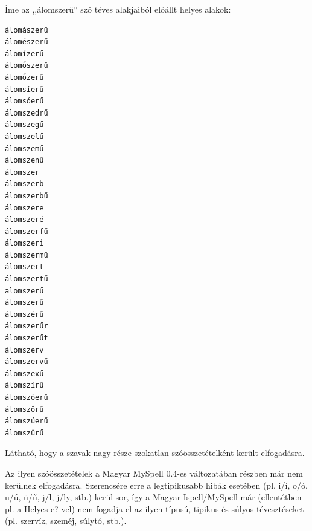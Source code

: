 Íme az ,,álomszerű'' szó téves alakjaiból előállt helyes
alakok:

\begin{verbatim}
álomászerű
álomészerű
álomízerű
álomőszerű
álomőzerű
álomsíerű
álomsóerű
álomszedrű
álomszegű
álomszelű
álomszemű
álomszenű
álomszer
álomszerb
álomszerbű
álomszere
álomszeré
álomszerfű
álomszeri
álomszermű
álomszert
álomszertű
alomszerű
álomszerű
álomszérű
álomszerűr
álomszerűt
álomszerv
álomszervű
álomszexű
álomszírű
álomszóerű
álomszőrű
álomszúerű
álomszűrű
\end{verbatim}

Látható, hogy a szavak nagy része szokatlan
szóösszetételként került elfogadásra.

Az ilyen szóösszetételek a Magyar MySpell 0.4-es változatában
részben már nem kerülnek elfogadásra. Szerencsére erre a legtipikusabb
hibák esetében (pl. i/í, o/ó, u/ú, ü/ű, j/l, j/ly, stb.)
kerül sor, így a Magyar Ispell/MySpell már (ellentétben pl. a
Helyes-e?-vel) nem fogadja el az ilyen típusú, tipikus és súlyos tévesztéseket
(pl. szervíz, szeméj, súlytó, stb.).

